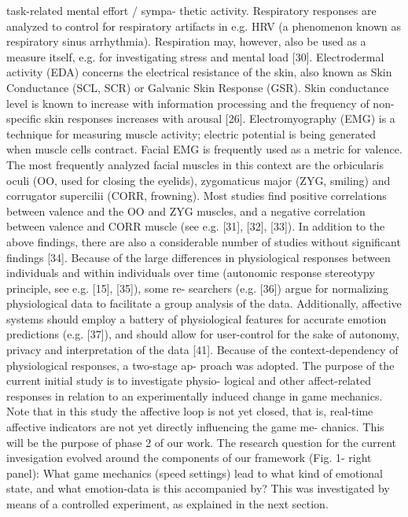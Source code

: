 \documentclass{uofsthesis-cs}
\begin{document}
task-related mental effort / sympa- thetic activity. Respiratory responses are analyzed to control for respiratory artifacts in e.g. HRV (a phenomenon known as respiratory sinus arrhythmia). Respiration may, however, also be used as a measure itself, e.g. for investigating stress and mental load [30]. Electrodermal activity (EDA) concerns the electrical resistance of the skin, also known as Skin Conductance (SCL, SCR) or Galvanic Skin Response (GSR). Skin conductance level is known to increase with information processing and the frequency of non-specific skin responses increases with arousal [26]. Electromyography (EMG) is a technique for measuring muscle activity; electric potential is being generated when muscle cells contract. Facial EMG is frequently used as a metric for valence. The most frequently analyzed facial muscles in this context are the orbicularis oculi (OO, used for closing the eyelids), zygomaticus major (ZYG, smiling) and corrugator supercilii (CORR, frowning). Most studies find positive correlations between valence and the OO and ZYG muscles, and a negative correlation between valence and CORR muscle (see e.g. [31], [32], [33]). In addition to the above findings, there are also a considerable number of studies without significant findings [34]. Because of the large differences in physiological responses between individuals and within individuals over time (autonomic response stereotypy principle, see e.g. [15], [35]), some re- searchers (e.g. [36]) argue for normalizing physiological data to facilitate a group analysis of the data. Additionally, affective systems should employ a battery of physiological features for accurate emotion predictions (e.g. [37]), and should allow for user-control for the sake of autonomy, privacy and interpretation of the data [41]. Because of the context-dependency of physiological responses, a two-stage ap- proach was adopted. The purpose of the current initial study is to investigate physio- logical and other affect-related responses in relation to an experimentally induced change in game mechanics. Note that in this study the affective loop is not yet closed, that is, real-time affective indicators are not yet directly influencing the game me- chanics. This will be the purpose of phase 2 of our work. The research question for the current invesigation evolved around the components of our framework (Fig. 1- right panel): What game mechanics (speed settings) lead to what kind of emotional state, and what emotion-data is this accompanied by? This was investigated by means of a controlled experiment, as explained in the next section.
\end{document}
